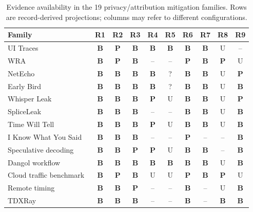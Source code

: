 \begin{table}[t]\centering\footnotesize
\caption{Evidence availability in the 19 privacy/attribution mitigation families. Rows are record-derived projections; columns may refer to different configurations.}\label{tab:family-audit}
\setlength{\tabcolsep}{2.2pt}
\begin{tabularx}{\columnwidth}{@{}Y*{9}{c}@{}}\toprule
Family & R1 & R2 & R3 & R4 & R5 & R6 & R7 & R8 & R9\\\midrule
UI Traces~\cite{uitraces2026} & \textbf{B} & \textbf{P} & \textbf{B} & \textbf{B} & \textbf{B} & \textbf{B} & \textbf{B} & U & --\\
WRA~\cite{jeong2026wra} & \textbf{B} & \textbf{P} & \textbf{B} & -- & -- & \textbf{P} & \textbf{B} & \textbf{P} & U\\
NetEcho~\cite{netecho2025} & \textbf{B} & \textbf{B} & \textbf{B} & \textbf{B} & ? & \textbf{B} & \textbf{B} & U & \textbf{P}\\
Early Bird~\cite{earlybird2025} & \textbf{B} & \textbf{B} & \textbf{B} & \textbf{B} & ? & \textbf{B} & \textbf{B} & U & \textbf{B}\\
Whisper Leak~\cite{whisperleak2025} & \textbf{B} & \textbf{B} & \textbf{B} & \textbf{P} & U & \textbf{B} & \textbf{B} & U & \textbf{P}\\
SpliceLeak~\cite{spliceleak2026} & \textbf{B} & \textbf{B} & \textbf{B} & -- & -- & \textbf{B} & \textbf{B} & U & \textbf{B}\\
Time Will Tell~\cite{timewilltell2024} & \textbf{B} & \textbf{B} & \textbf{B} & \textbf{P} & U & \textbf{B} & \textbf{B} & U & \textbf{B}\\
I Know What You Said~\cite{gao2025iknow} & \textbf{B} & \textbf{B} & \textbf{B} & -- & -- & \textbf{P} & -- & -- & \textbf{B}\\
Speculative decoding~\cite{wei2024speculation} & \textbf{B} & \textbf{B} & \textbf{P} & \textbf{P} & U & \textbf{B} & \textbf{B} & -- & \textbf{B}\\
Dangol workflow~\cite{dangol2026workflow} & \textbf{B} & \textbf{B} & \textbf{B} & \textbf{B} & \textbf{B} & \textbf{B} & \textbf{B} & U & \textbf{B}\\
Cloud traffic benchmark~\cite{pouryousef2026traffic} & \textbf{B} & \textbf{P} & \textbf{B} & U & U & \textbf{P} & \textbf{B} & \textbf{P} & U\\
Remote timing~\cite{carlini2024remote} & \textbf{B} & \textbf{B} & \textbf{P} & -- & -- & \textbf{B} & -- & U & \textbf{B}\\
TDXRay~\cite{hornetz2026tdxray} & \textbf{B} & \textbf{B} & \textbf{B} & -- & -- & \textbf{B} & -- & \textbf{B} & \textbf{B}\\

\end{tabularx}
\end{table}
